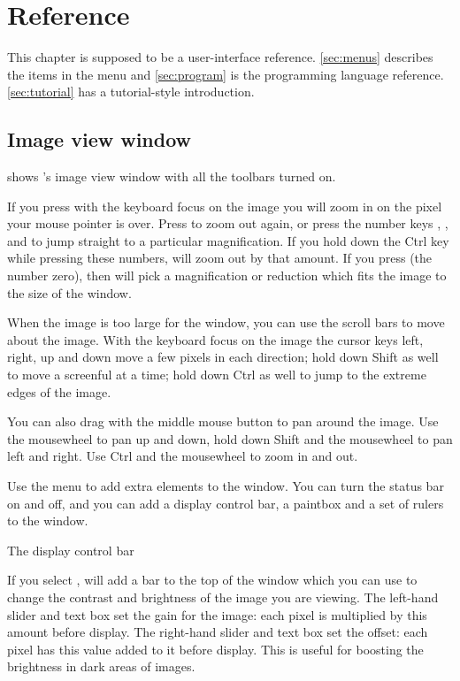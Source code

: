 \chapter{Reference}

\noindent
This chapter is supposed to be a user-interface reference.
\cref{sec:menus} describes the items in the  menu
and \cref{sec:program} is the programming language 
reference. \cref{sec:tutorial} has a tutorial-style introduction.

\section{Image view window}

 shows \nip{}'s image view window with all the toolbars
turned on.

If you press  with the keyboard focus on the image you will
zoom in on the pixel your mouse pointer is over. Press  to zoom
out again, or press the number keys , ,  and 
to jump straight to a particular magnification. If you hold down the
Ctrl key while pressing these numbers, \nip{} will zoom out by
that amount. If you press  (the number zero), then \nip{} will pick
a magnification or reduction which fits the image to the size of the window.

When the image is too large for the window, you can use the scroll bars
to move about the image. With the keyboard focus on the image the cursor
keys left, right, up and down move a few pixels in each direction; hold down
Shift as well to move a screenful at a time; hold down Ctrl as well to jump
to the extreme edges of the image. 

You can also drag with the middle mouse button to pan around the image. Use
the mousewheel to pan up and down, hold down Shift and the mousewheel to
pan left and right.  Use Ctrl and the mousewheel to zoom in and out.

Use the  menu to add extra elements to the window.  You can turn
the status bar on and off, and you can add a display control bar, a paintbox
and a set of rulers to the window. 

\begin{fig2}
\caption{The display control bar}
\end{fig2}

If you select , \nip{} will add a
bar to the top of the window which you can use to change the contrast and
brightness of the image you are viewing. The left-hand slider and text box
set the gain for the image: each pixel is multiplied by this amount
before display. The right-hand slider and text box set the offset:
each pixel has this value added to it before display. This is useful
for boosting the brightness in dark areas of images.

